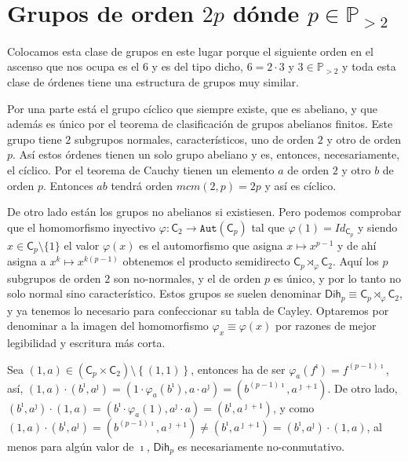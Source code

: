 \documentclass[12pt,a4paper,fleqn,spanish,final,openright]{extbook}
\theoremstyle{definition}
\theoremstyle{remark}
\begin{document}
\chapter{Grupos de orden $2p$ dónde $p \in \mathds{P}_{>2}$}

Colocamos esta clase de grupos en este lugar porque el siguiente orden en el ascenso que nos ocupa es el $6$ y es del tipo dicho, $6=2  \cdot 3$ y $3  \in \mathds{P}_{>2}$ y toda esta clase de órdenes tiene una estructura de grupos muy similar.

Por una parte está el grupo cíclico que siempre existe, que es abeliano, y que además es único por el teorema de clasificación de grupos abelianos finitos. Este grupo tiene $2$ subgrupos normales, característicos, uno de orden $2$ y otro de orden $p$. Así estos órdenes tienen un solo grupo abeliano y es, entonces, necesariamente, el cíclico. Por el teorema de Cauchy tienen un elemento $a$ de orden $2$ y otro $b$ de orden $p$. Entonces $ab$ tendrá orden $mcm(2,p)=2p$ y así es cíclico.

De otro lado están los grupos no abelianos si existiesen. Pero podemos comprobar que el homomorfismo inyectivo $\varphi : \mathsf{C}_2   \longrightarrow   \mathtt{Aut}(\mathsf{C}_p)$ tal que $\varphi (1)=Id_{\mathsf{C}_{p}}$ y siendo $x  \in {\mathsf{C}_{p}}\setminus\{1\}$ el valor $\varphi (x)$ es el automorfismo que asigna $x   \mapsto x^{p-1}$ y de ahí asigna a $x^k \mapsto x^{k(p-1)}$ obtenemos el producto semidirecto $\textsf{C}_{p} {\rtimes}_{\varphi } \mathsf{C}_{2}$. Aquí los $p$ subgrupos de orden $2$ son no-normales, y el de orden $p$ es único, y por lo tanto no solo normal sino característico. Estos grupos se suelen denominar $\mathsf{Dih}_{p} \equiv \mathsf{C}_{p} {\rtimes}_{\varphi } \mathsf{C}_{2}$, y ya tenemos lo necesario para confeccionar su tabla de Cayley. Optaremos por denominar a la imagen del homomorfismo $\varphi_x  \equiv  \varphi (x)$ por razones de mejor legibilidad y escritura más corta.

Sea $(1,a) \in \left(\textsf{C}_{p} \times \textsf{C}_{2}\right)\setminus\left\lbrace{(1,1)}\right\rbrace$, entonces ha de ser $\varphi_{a}(f^\imath)=f^{(p-1)\imath}$, así, $(1,a) \cdot (b^\imath,a^\jmath)=(1 \cdot \varphi_a (b^\imath),a  \cdot a^\jmath)=(b^{(p-1)\imath},a^{\jmath + 1})$. De otro lado, $(b^\imath,a^\jmath) \cdot (1,a)=(b^\imath  \cdot \varphi_a (1),a^\jmath  \cdot a)=(b^{\imath},a^{\jmath + 1})$, y como $(1,a) \cdot (b^\imath,a^\jmath)=(b^{(p-1)\imath},a^{\jmath + 1})  \neq  (b^{\imath},a^{\jmath + 1}) = (b^\imath,a^\jmath) \cdot (1,a)$, al menos para algún valor de $\imath$, $\mathsf{Dih}_{p}$ es necesariamente no-conmutativo.
\end{document}
